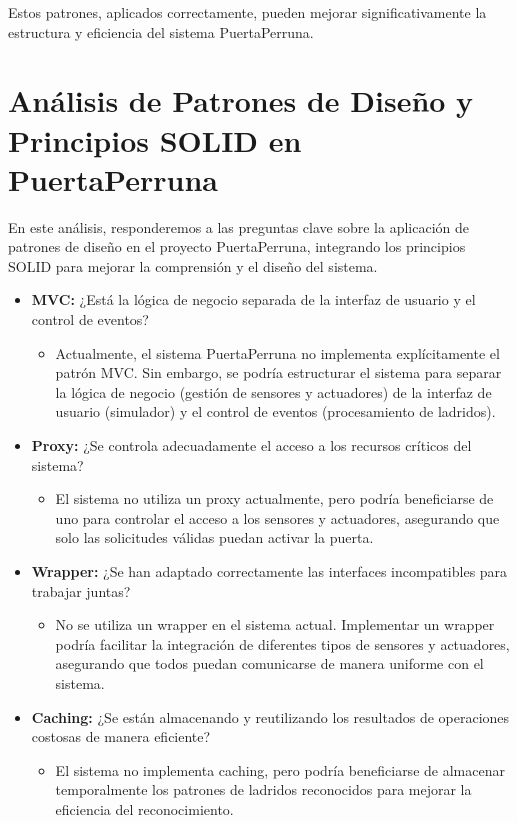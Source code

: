 Estos patrones, aplicados correctamente, pueden mejorar significativamente la estructura y eficiencia del sistema PuertaPerruna.

\section{Análisis de Patrones de Diseño y Principios SOLID en PuertaPerruna}

En este análisis, responderemos a las preguntas clave sobre la aplicación de patrones de diseño en el proyecto PuertaPerruna, integrando los principios SOLID para mejorar la comprensión y el diseño del sistema.

\begin{itemize}
    \item \textbf{MVC:} ¿Está la lógica de negocio separada de la interfaz de usuario y el control de eventos?
    \begin{itemize}
        \item Actualmente, el sistema PuertaPerruna no implementa explícitamente el patrón MVC. Sin embargo, se podría estructurar el sistema para separar la lógica de negocio (gestión de sensores y actuadores) de la interfaz de usuario (simulador) y el control de eventos (procesamiento de ladridos).
    \end{itemize}
    
    \item \textbf{Proxy:} ¿Se controla adecuadamente el acceso a los recursos críticos del sistema?
    \begin{itemize}
        \item El sistema no utiliza un proxy actualmente, pero podría beneficiarse de uno para controlar el acceso a los sensores y actuadores, asegurando que solo las solicitudes válidas puedan activar la puerta.
    \end{itemize}
    
    \item \textbf{Wrapper:} ¿Se han adaptado correctamente las interfaces incompatibles para trabajar juntas?
    \begin{itemize}
        \item No se utiliza un wrapper en el sistema actual. Implementar un wrapper podría facilitar la integración de diferentes tipos de sensores y actuadores, asegurando que todos puedan comunicarse de manera uniforme con el sistema.
    \end{itemize}
    
    \item \textbf{Caching:} ¿Se están almacenando y reutilizando los resultados de operaciones costosas de manera eficiente?
    \begin{itemize}
        \item El sistema no implementa caching, pero podría beneficiarse de almacenar temporalmente los patrones de ladridos reconocidos para mejorar la eficiencia del reconocimiento.
    \end{itemize}
\end{itemize}

